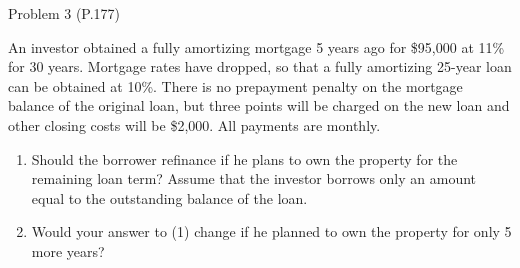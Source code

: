 \documentclass[ignorenonframetext,]{beamer}
\providecommand{\tightlist}{%
\setlength{\itemsep}{0pt}\setlength{\parskip}{0pt}}
\begin{document}
\begin{frame}{Problem 3 (P.177)}

An investor obtained a fully amortizing mortgage 5 years ago for
\$95,000 at 11\% for 30 years. Mortgage rates have dropped, so that a
fully amortizing 25-year loan can be obtained at 10\%. There is no
prepayment penalty on the mortgage balance of the original loan, but
three points will be charged on the new loan and other closing costs
will be \$2,000. All payments are monthly.

\begin{enumerate}
\def\labelenumi{\arabic{enumi}.}
\tightlist
\item
  Should the borrower refinance if he plans to own the property for the
  remaining loan term? Assume that the investor borrows only an amount
  equal to the outstanding balance of the loan.
\item
  Would your answer to (1) change if he planned to own the property for
  only 5 more years?
\end{enumerate}

\end{frame}
\end{document}
